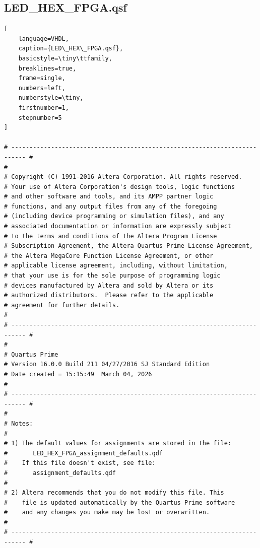 \documentclass[conference]{IEEEtran}
\begin{document}
\subsection{LED\_HEX\_FPGA.qsf}

\begin{lstlisting}[
    language=VHDL, 
    caption={LED\_HEX\_FPGA.qsf}, 
    basicstyle=\tiny\ttfamily, 
    breaklines=true, 
    frame=single, 
    numbers=left, 
    numberstyle=\tiny, 
    firstnumber=1, 
    stepnumber=5
]

# -------------------------------------------------------------------------- #
#
# Copyright (C) 1991-2016 Altera Corporation. All rights reserved.
# Your use of Altera Corporation's design tools, logic functions 
# and other software and tools, and its AMPP partner logic 
# functions, and any output files from any of the foregoing 
# (including device programming or simulation files), and any 
# associated documentation or information are expressly subject 
# to the terms and conditions of the Altera Program License 
# Subscription Agreement, the Altera Quartus Prime License Agreement,
# the Altera MegaCore Function License Agreement, or other 
# applicable license agreement, including, without limitation, 
# that your use is for the sole purpose of programming logic 
# devices manufactured by Altera and sold by Altera or its 
# authorized distributors.  Please refer to the applicable 
# agreement for further details.
#
# -------------------------------------------------------------------------- #
#
# Quartus Prime
# Version 16.0.0 Build 211 04/27/2016 SJ Standard Edition
# Date created = 15:15:49  March 04, 2026
#
# -------------------------------------------------------------------------- #
#
# Notes:
#
# 1) The default values for assignments are stored in the file:
#		LED_HEX_FPGA_assignment_defaults.qdf
#    If this file doesn't exist, see file:
#		assignment_defaults.qdf
#
# 2) Altera recommends that you do not modify this file. This
#    file is updated automatically by the Quartus Prime software
#    and any changes you make may be lost or overwritten.
#
# -------------------------------------------------------------------------- #



\end{lstlisting}
\end{document}

